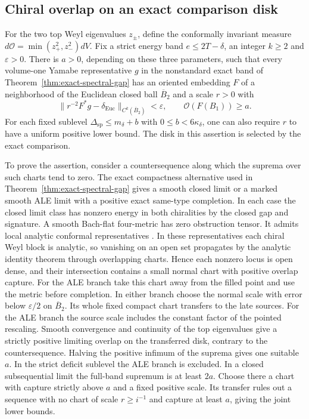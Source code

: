 
\subsection{Chiral overlap on an exact comparison disk}
\label{sec:exact-overlap}

For the two top Weyl eigenvalues \(z_\pm\), define the conformally
invariant measure \(d\mathcal O=\min(z_+^2,z_-^2)dV\).
Fix a strict energy band \(e\le 2T-\delta\), an integer \(k\ge2\)
and \(\varepsilon>0\). There is \(a>0\), depending on these three
parameters, such that every volume-one Yamabe representative \(g\)
in the nonstandard exact band of Theorem~\ref{thm:exact-spectral-gap}
has an oriented embedding \(F\) of a neighborhood of the Euclidean
closed ball \(\overline B_2\) and a scale \(r>0\) with
\[
 \|r^{-2}F^*g-\delta_{\mathrm{Euc}}\|_{C^k(\overline B_2)}
       <\varepsilon,\qquad
 \mathcal O(F(B_1))\ge a .
\]
For each fixed sublevel \(\Delta_{\mathrm{sp}}\le m_\delta+b\)
with \(0\le b<6\kappa_\delta\), one can also require \(r\) to
have a uniform positive lower bound. The disk in this assertion is
selected by the exact comparison.

To prove the assertion, consider a countersequence along which the
suprema over such charts tend to zero. The exact compactness
alternative used in Theorem~\ref{thm:exact-spectral-gap} gives a
smooth closed limit or a marked smooth ALE limit with a positive
exact same-type completion. In each case the closed limit class
has nonzero energy in both chiralities by the closed gap and
signature. A smooth Bach-flat four-metric has zero obstruction
tensor. It admits local analytic conformal representatives
\cite[Theorem~1.3(c)]{LassasLiimatainen2019ConformalHarmonic}.
In these representatives each chiral Weyl block is analytic,
so vanishing on an open set propagates by the analytic identity
theorem through overlapping charts. Hence each nonzero locus is
open dense, and their intersection contains a small normal chart
with positive overlap capture. For the ALE branch take this chart
away from the filled point and use the metric before completion.
In either branch choose the normal scale with error below
\(\varepsilon/2\) on \(\overline B_2\). Its whole fixed
compact chart transfers to the late sources. For the ALE branch
the source scale includes the constant factor of the pointed
rescaling. Smooth convergence and continuity of the top
eigenvalues give a strictly positive limiting overlap on the
transferred disk, contrary to the countersequence. Halving the
positive infimum of the suprema gives one suitable \(a\).
In the strict deficit sublevel the ALE branch is excluded.
In a closed subsequential limit the full-band supremum is at
least \(2a\). Choose there a chart with capture strictly above
\(a\) and a fixed positive scale. Its transfer rules out a
sequence with no chart of scale \(r\ge i^{-1}\) and capture
at least \(a\), giving the joint lower bounds.

